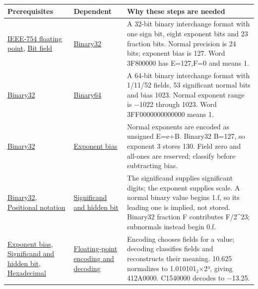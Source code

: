 {\def\LTcaptype{none} %
\begin{longtable}[]{@{}
  >{\raggedright\arraybackslash}p{}
  >{\raggedright\arraybackslash}p{}
  >{\raggedright\arraybackslash}p{}@{}}
\toprule\noalign{}
\begin{minipage}[b]{\linewidth}\raggedright
Prerequisites
\end{minipage} & \begin{minipage}[b]{\linewidth}\raggedright
Dependent
\end{minipage} & \begin{minipage}[b]{\linewidth}\raggedright
Why these steps are needed
\end{minipage} \\
\midrule\noalign{}
\endhead
\bottomrule\noalign{}
\endlastfoot
\hyperref[appendix-343615f49ddf]{IEEE-754 floating point}, \hyperref[appendix-ac697f5c66e8]{Bit field} & \hyperref[appendix-5057f9ad327f]{Binary32} & A 32-bit binary interchange format with one sign bit, eight exponent bits and 23 fraction bits. Normal precision is 24 bits; exponent bias is 127. Word 3F800000 has E=127,F=0 and means 1. \\
\hyperref[appendix-5057f9ad327f]{Binary32} & \hyperref[appendix-5078dfab64e6]{Binary64} & A 64-bit binary interchange format with 1/11/52 fields, 53 significant normal bits and bias 1023. Normal exponent range is −1022 through 1023. Word 3FF0000000000000 means 1. \\
\hyperref[appendix-5057f9ad327f]{Binary32} & \hyperref[appendix-2fae058c82e1]{Exponent bias} & Normal exponents are encoded as unsigned E=e+B. Binary32 B=127, so exponent 3 stores 130. Field zero and all-ones are reserved; classify before subtracting bias. \\
\hyperref[appendix-5057f9ad327f]{Binary32}, \hyperref[appendix-83c3f28f7bda]{Positional notation} & \hyperref[appendix-a24fd710cf67]{Significand and hidden bit} & The significand supplies significant digits; the exponent supplies scale. A normal binary value begins 1.f, so its leading one is implied, not stored. Binary32 fraction F contributes F/2\^{}23; subnormals instead begin 0.f. \\
\hyperref[appendix-2fae058c82e1]{Exponent bias}, \hyperref[appendix-a24fd710cf67]{Significand and hidden bit}, \hyperref[appendix-6b8075763724]{Hexadecimal} & \hyperref[appendix-6854d0e2218e]{Floating-point encoding and decoding} & Encoding chooses fields for a value; decoding classifies fields and reconstructs their meaning. 10.625 normalizes to 1.010101₂×2³, giving 412A0000. C1540000 decodes to −13.25. \\

\end{longtable}}
